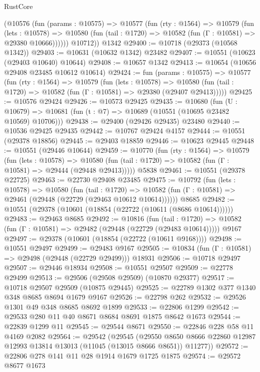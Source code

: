 \begin{lexlean}{RustCore}
\begin{coremodule}
        (@10576
          (fun (params : @10575) =>
          @10577
            (fun (rty : @1564) =>
            @10579
              (fun (lets : @10578) =>
              @10580 (fun (tail : @1720) => @10582 (fun (Γ : @10581) => @29380 @10666))))))
        @10712))
    @1342
@29400 := @10718 (@29373 (@10568 @1342))
@29403 := @10631 (@10632 @1342) @23482
@29407 := @10551 (@10623 (@29403 @10640) @10644)
@29408 := @10657 @1342
@29413 := @10654 (@10656 @29408 @23485 @10612 @10614)
@29424 := fun (params : @10575) =>
  @10577
    (fun (rty : @1564) =>
    @10579
      (fun (lets : @10578) =>
      @10580 (fun (tail : @1720) => @10582 (fun (Γ : @10581) => @29380 (@29407 @29413)))))
@29425 := @10576 @29424
@29426 := @10573 @29425
@29435 := @10680
    (fun (U : @10679) => @10681 (fun (t : @7) => @10689 (@10551 (@10695 @23482 @10569) @10706)))
@29438 := @29400 (@29426 @29435) @23480
@29440 := @10536 @29425 @29435
@29442 := @10767 @29424 @4157
@29444 := @10551 (@29378 @18856)
@29445 := @29403 @18859
@29446 := @10623 @29445
@29448 := @10551 (@29446 @10644)
@29459 := @10770
    (fun (rty : @1564) =>
    @10579
      (fun (lets : @10578) =>
      @10580 (fun (tail : @1720) => @10582 (fun (Γ : @10581) => @29444 (@29448 @29413)))))
    @5838
@29461 := @10551 (@29378 @22725)
@29463 := @22730 @29408 @23485
@29475 := @10792
    (fun (lets : @10578) =>
    @10580
      (fun (tail : @1720) =>
      @10582 (fun (Γ : @10581) => @29461 (@29448 (@22729 (@29463 @10612 @10614))))))
    @8685
@29482 := @10551 (@29378 (@10601 (@18854 (@22722 (@10611 (@8686 @10614))))))
@29483 := @29463 @8685
@29492 := @10816
    (fun (tail : @1720) => @10582 (fun (Γ : @10581) => @29482 (@29448 (@22729 (@29483 @10614)))))
    @9167
@29497 := @29378 (@10601 (@18854 (@22722 (@10611 @9168))))
@29498 := @10551 @29497
@29499 := @29483 @9167
@29505 := @10834 (fun (Γ : @10581) => @29498 (@29448 (@22729 @29499))) @18931
@29506 := @10718 @29497
@29507 := @29446 @18934
@29508 := @10551 @29507
@29509 := @22778 @29499
@29513 := @29506 (@29508 @29509) (@10870 @29377)
@29517 := @10718 @29507 @29509 (@10875 @29445)
@29525 := @22789 @1302 @377 @1340 @348 @8685 @8694 @1679 @9167
@29526 := @22798 @262
@29532 := @29526 @1301 @49 @348 @8685 @8692 @1899
@29533 := @22806 @1299
@29542 := @29533 @280 @11 @40 @8671 @8684 @8691 @1875 @8642 @1673
@29544 := @22839 @1299 @11
@29545 := @29544 @8671
@29550 := @22846 @228 @58 @11 @4169 @2082
@29564 := @29542
    (@29545
      (@29550 @8650 @8666 @22860 @12987 @12993 @13814 @13013 (@11045 (@13015 @8666 @8651)) @11277))
@29572 := @22806 @278 @141 @11 @28 @1914 @1679 @1725 @1875
@29574 := @29572 @8677 @1673

\end{coremodule}
\end{lexlean}
